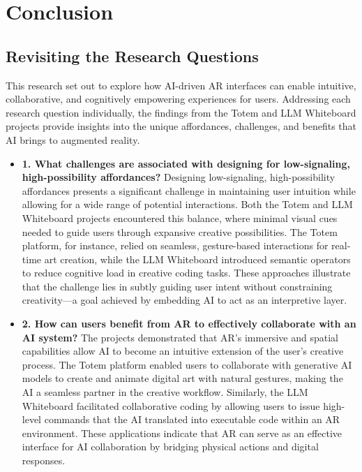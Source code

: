 \section{Conclusion}

\subsection{Revisiting the Research Questions}
This research set out to explore how AI-driven AR interfaces can enable intuitive, collaborative, and cognitively empowering experiences for users.
Addressing each research question individually, the findings from the Totem and LLM Whiteboard projects provide insights into the unique affordances, challenges, and benefits that AI brings to augmented reality.

\begin{itemize}
    \item \textbf{1. What challenges are associated with designing for low-signaling, high-possibility affordances?} Designing low-signaling, high-possibility affordances presents a significant challenge in maintaining user intuition while allowing for a wide range of potential interactions.
    Both the Totem and LLM Whiteboard projects encountered this balance, where minimal visual cues needed to guide users through expansive creative possibilities.
    The Totem platform, for instance, relied on seamless, gesture-based interactions for real-time art creation, while the LLM Whiteboard introduced semantic operators to reduce cognitive load in creative coding tasks.
    These approaches illustrate that the challenge lies in subtly guiding user intent without constraining creativity—a goal achieved by embedding AI to act as an interpretive layer.%
    
    \item \textbf{2. How can users benefit from AR to effectively collaborate with an AI system?} The projects demonstrated that AR’s immersive and spatial capabilities allow AI to become an intuitive extension of the user's creative process.
    The Totem platform enabled users to collaborate with generative AI models to create and animate digital art with natural gestures, making the AI a seamless partner in the creative workflow.
    Similarly, the LLM Whiteboard facilitated collaborative coding by allowing users to issue high-level commands that the AI translated into executable code within an AR environment.
    These applications indicate that AR can serve as an effective interface for AI collaboration by bridging physical actions and digital responses.%
    

\end{itemize}
